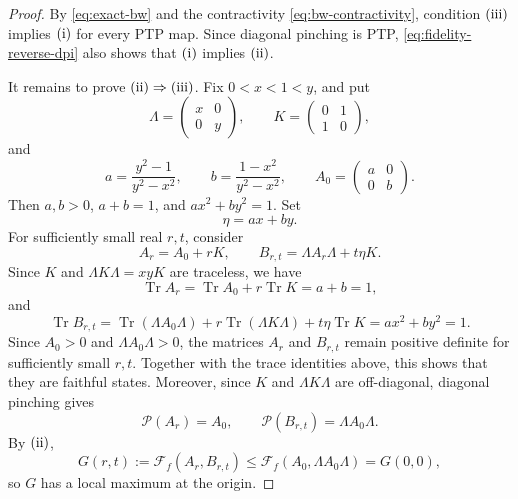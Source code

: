 \documentclass[11pt]{amsart}
\theoremstyle{definition}
\theoremstyle{remark}
\newcommand{\Tr}{\operatorname{Tr}}
\begin{document}
\begin{proof}
By \eqref{eq:exact-bw} and the contractivity
\eqref{eq:bw-contractivity}, condition ${\rm(iii)}$ implies
${\rm(i)}$ for every PTP map.  Since diagonal pinching is PTP,
\eqref{eq:fidelity-reverse-dpi} also shows that
${\rm(i)}$ implies ${\rm(ii)}$.
	
	It remains to prove ${\rm(ii)}\Rightarrow{\rm(iii)}$.  Fix
$0<x<1<y$, and put
\[
\Lambda=\begin{pmatrix}x&0\\0&y\end{pmatrix},
\qquad
K=\begin{pmatrix}0&1\\1&0\end{pmatrix},
\]
and
\[
a=\frac{y^2-1}{y^2-x^2},
\qquad
b=\frac{1-x^2}{y^2-x^2},
\qquad
A_0=\begin{pmatrix}a&0\\0&b\end{pmatrix}.
\]
Then $a,b>0$, $a+b=1$, and $ax^2+by^2=1$.  Set
\[
\eta=ax+by.
\]
For sufficiently small real $r,t$, consider
\[
A_r=A_0+rK,
\qquad
B_{r,t}=\Lambda A_r\Lambda+t\eta K.
\]
Since $K$ and $\Lambda K\Lambda=xyK$ are traceless, we have
\[
\Tr A_r
=\Tr A_0+r\Tr K
=a+b=1,
\]
and
\[
\Tr B_{r,t}
=\Tr(\Lambda A_0\Lambda)+r\Tr(\Lambda K\Lambda)+t\eta\Tr K
=ax^2+by^2=1.
\]
Since $A_0>0$ and $\Lambda A_0\Lambda>0$, the matrices $A_r$ and
$B_{r,t}$ remain positive definite for sufficiently small $r,t$.
Together with the trace identities above, this shows that they are
faithful states.  Moreover, since $K$ and $\Lambda K\Lambda$ are
off-diagonal, diagonal pinching gives
\[
\mathcal P(A_r)=A_0,
\qquad
\mathcal P(B_{r,t})=\Lambda A_0\Lambda.
\]
By ${\rm(ii)}$,
\[
G(r,t):=\mathcal F_f(A_r,B_{r,t})
\le \mathcal F_f(A_0,\Lambda A_0\Lambda)=G(0,0),
\]
so $G$ has a local maximum at the origin.


\end{proof}
\end{document}
